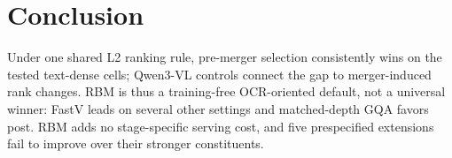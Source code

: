 \documentclass[sigconf,nonacm]{acmart}
\begin{document}
\section{Conclusion}\label{sec:conclusion}

Under one shared L2 ranking rule, pre-merger selection consistently wins on the
tested text-dense cells; Qwen3-VL controls connect the gap to merger-induced
rank changes. RBM is thus a training-free OCR-oriented default, not a universal
winner: FastV leads on several other settings and matched-depth GQA favors post.
RBM adds no stage-specific serving cost, and five prespecified extensions fail
to improve over their stronger constituents.




\clearpage
\def\RBMIntegratedSupplement{1}

\end{document}

